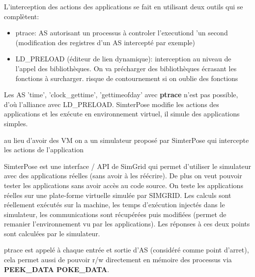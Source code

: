 \documentclass{article}
\begin{document}
L'interception des actions des applications se fait en utilisant deux outils qui
se complètent:
\begin{itemize}
\item ptrace: AS autorisant un processus à controler l'executiond 'un second
  (modification des registres d'un AS intercepté par exemple)
\item LD\_PRELOAD (éditeur de lien dynamique): interception au niveau de l'appel
  des bibliothèques. On va précharger des bibliothèques écrasant les fonctions à
  surcharger. {\color{red} risque de contournement si on oublie des fonctions}
\end{itemize}

Les AS 'time', 'clock\_gettime', 'gettimeofday' avec \textbf{ptrace} n'est pas
possible, d'où l'alliance avec LD\_PRELOAD.  SimterPose modifie les actions des
applications et les exécute en environnement virtuel, il simule des applications
simples.

{\color{green} au lieu d'avoir des VM on a un simulateur proposé par SimterPose
  qui intercepte les actions de l'application}

SimterPose est une interface / API de SimGrid qui permet d'utiliser le
simulateur avec des applications réelles (sans avoir à les réécrire). De plus on
veut pouvoir tester les applications sans avoir accès au code source. On teste
les applications réelles sur une plate-forme virtuelle simulée par SIMGRID. Les
calculs sont réellement exécutés sur la machine, les temps d'exécution injectés
dans le simulateur, les communications sont récupérées puis modifiées (permet de
remanier l'environnement vu par les applications). Les réponses à ces deux
points sont calculées par le simulateur.

ptrace est appelé à chaque entrée et sortie d'AS (considéré comme point
d'arret), cela permet aussi de pouvoir r/w directement en mémoire des processus
via \textbf{PEEK\_DATA POKE\_DATA}.
\end{document}
